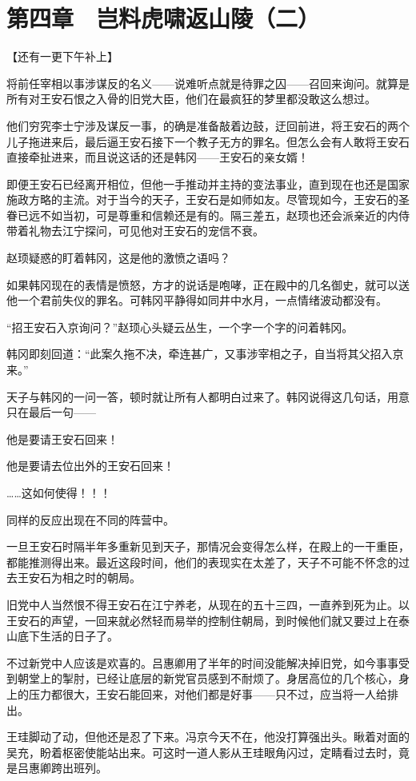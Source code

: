 \section{第四章　岂料虎啸返山陵（二）}

【还有一更下午补上】

将前任宰相以事涉谋反的名义——说难听点就是待罪之囚——召回来询问。就算是所有对王安石恨之入骨的旧党大臣，他们在最疯狂的梦里都没敢这么想过。

他们穷究李士宁涉及谋反一事，的确是准备敲着边鼓，迂回前进，将王安石的两个儿子拖进来后，最后逼王安石接下一个教子无方的罪名。但怎么会有人敢将王安石直接牵扯进来，而且说这话的还是韩冈——王安石的亲女婿！

即便王安石已经离开相位，但他一手推动并主持的变法事业，直到现在也还是国家施政方略的主流。对于当今的天子，王安石是如师如友。尽管现如今，王安石的圣眷已远不如当初，可是尊重和信赖还是有的。隔三差五，赵顼也还会派亲近的内侍带着礼物去江宁探问，可见他对王安石的宠信不衰。

赵顼疑惑的盯着韩冈，这是他的激愤之语吗？

如果韩冈现在的表情是愤怒，方才的说话是咆哮，正在殿中的几名御史，就可以送他一个君前失仪的罪名。可韩冈平静得如同井中水月，一点情绪波动都没有。

“招王安石入京询问？”赵顼心头疑云丛生，一个字一个字的问着韩冈。

韩冈即刻回道：“此案久拖不决，牵连甚广，又事涉宰相之子，自当将其父招入京来。”

天子与韩冈的一问一答，顿时就让所有人都明白过来了。韩冈说得这几句话，用意只在最后一句——

他是要请王安石回来！

他是要请去位出外的王安石回来！

……这如何使得！！！

同样的反应出现在不同的阵营中。

一旦王安石时隔半年多重新见到天子，那情况会变得怎么样，在殿上的一干重臣，都能推测得出来。最近这段时间，他们的表现实在太差了，天子不可能不怀念的过去王安石为相之时的朝局。

旧党中人当然恨不得王安石在江宁养老，从现在的五十三四，一直养到死为止。以王安石的声望，一回来就必然轻而易举的控制住朝局，到时候他们就又要过上在泰山底下生活的日子了。

不过新党中人应该是欢喜的。吕惠卿用了半年的时间没能解决掉旧党，如今事事受到朝堂上的掣肘，已经让底层的新党官员感到不耐烦了。身居高位的几个核心，身上的压力都很大，王安石能回来，对他们都是好事——只不过，应当将一人给排出。

王珪脚动了动，但他还是忍了下来。冯京今天不在，他没打算强出头。瞅着对面的吴充，盼着枢密使能站出来。可这时一道人影从王珪眼角闪过，定睛看过去时，竟是吕惠卿跨出班列。

